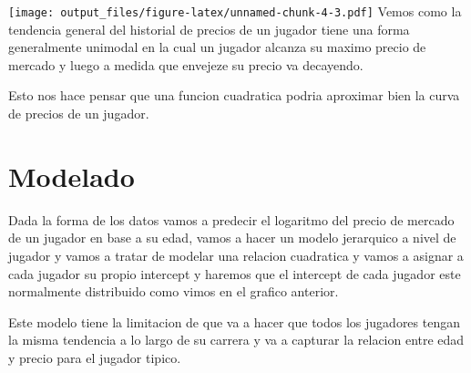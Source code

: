 \documentclass[
]{article}
\begin{document}
\texttt{[image: output\_files/figure-latex/unnamed-chunk-4-3.pdf]} Vemos
como la tendencia general del historial de precios de un jugador tiene
una forma generalmente unimodal en la cual un jugador alcanza su maximo
precio de mercado y luego a medida que envejeze su precio va decayendo.

Esto nos hace pensar que una funcion cuadratica podria aproximar bien la
curva de precios de un jugador.

\section{Modelado}\label{modelado}

Dada la forma de los datos vamos a predecir el logaritmo del precio de
mercado de un jugador en base a su edad, vamos a hacer un modelo
jerarquico a nivel de jugador y vamos a tratar de modelar una relacion
cuadratica y vamos a asignar a cada jugador su propio intercept y
haremos que el intercept de cada jugador este normalmente distribuido
como vimos en el grafico anterior.

Este modelo tiene la limitacion de que va a hacer que todos los
jugadores tengan la misma tendencia a lo largo de su carrera y va a
capturar la relacion entre edad y precio para el jugador tipico.
\end{document}
